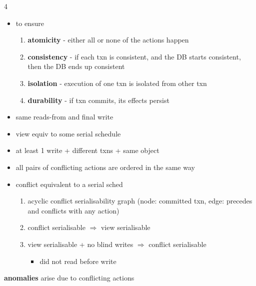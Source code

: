 \documentclass{article}
\begin{document}
\begin{multicols*}{4}
\begin{scriptsize}
  \begin{itemize}
    \item to ensure  
      \begin{enumerate}
        \item \textbf{atomicity} - either all or none of the actions happen
        \item \textbf{consistency} - if each txn is consistent, and the DB starts consistent, then the DB ends up consistent
        \item \textbf{isolation} - execution of one txn is isolated from other txn
        \item \textbf{durability} - if txn commits, its effects persist
      \end{enumerate}
  \end{itemize}

  \begin{itemize}
    \item {} same reads-from and final write
    \item {} view equiv to some serial schedule
    \item {} at least 1 write + different txns + same object
    \item {} all pairs of conflicting actions are ordered in the same way
  \end{itemize}

  \begin{itemize}
    \item {} conflict equivalent to a serial sched
      \begin{enumerate}
        \item acyclic conflict serialisability graph (node: committed txn, edge: precedes and conflicts with any action)
        \item conflict serialisable $\Rightarrow$ view serialisable
        \item view serialisable + no blind writes $\Rightarrow$ conflict serialisable
          \begin{itemize}
            \item {} did not read before write
          \end{itemize}
      \end{enumerate}
  \end{itemize}

  \textbf{anomalies} arise due to conflicting actions


\end{scriptsize}
\end{multicols*}
\end{document}
